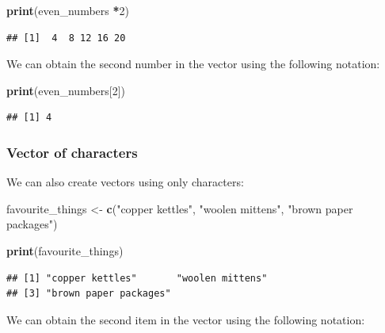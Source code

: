 \documentclass[
]{krantz}
\makeatletter
\newenvironment{Shaded}{\begin{snugshade}}{\end{snugshade}}
\newcommand{\DecValTok}[1]{\textcolor[rgb]{0.06,0.06,0.06}{#1}}
\newcommand{\KeywordTok}[1]{\textcolor[rgb]{0.27,0.27,0.27}{\textbf{#1}}}
\newcommand{\NormalTok}[1]{#1}
\newcommand{\OperatorTok}[1]{\textcolor[rgb]{0.43,0.43,0.43}{\textbf{#1}}}
\newcommand{\StringTok}[1]{\textcolor[rgb]{0.5,0.5,0.5}{#1}}
\newenvironment{kframe}{%
\medskip{}
\setlength{\fboxsep}{.8em}
 \def\at@end@of@kframe{}%
 \ifinner\ifhmode%
  \def\at@end@of@kframe{\end{minipage}}%
  \begin{minipage}{\columnwidth}%
 \fi\fi%
 \def\FrameCommand##1{\hskip\@totalleftmargin \hskip-\fboxsep
 \colorbox{shadecolor}{##1}\hskip-\fboxsep
     \hskip-\linewidth \hskip-\@totalleftmargin \hskip\columnwidth}%
 \MakeFramed {\advance\hsize-\width
   \@totalleftmargin\z@ \linewidth\hsize
   \@setminipage}}%
 {\par\unskip\endMakeFramed%
 \at@end@of@kframe}
\renewenvironment{Shaded}{\begin{kframe}}{\end{kframe}}
\makeatother
\begin{document}
\begin{Shaded}
\begin{Highlighting}[]
\KeywordTok{print}\NormalTok{(even_numbers }\OperatorTok{*}\DecValTok{2}\NormalTok{)}
\end{Highlighting}
\end{Shaded}

\begin{verbatim}
## [1]  4  8 12 16 20
\end{verbatim}

We can obtain the second number in the vector using the following notation:

\begin{Shaded}
\begin{Highlighting}[]
\KeywordTok{print}\NormalTok{(even_numbers[}\DecValTok{2}\NormalTok{])}
\end{Highlighting}
\end{Shaded}

\begin{verbatim}
## [1] 4
\end{verbatim}

\hypertarget{vector-of-characters}{%
\subsubsection{Vector of characters}\label{vector-of-characters}}

We can also create vectors using only characters:

\begin{Shaded}
\begin{Highlighting}[]
\NormalTok{favourite_things <-}\StringTok{ }\KeywordTok{c}\NormalTok{(}\StringTok{"copper kettles"}\NormalTok{, }\StringTok{"woolen mittens"}\NormalTok{, }\StringTok{"brown paper packages"}\NormalTok{)}
\end{Highlighting}
\end{Shaded}

\begin{Shaded}
\begin{Highlighting}[]
\KeywordTok{print}\NormalTok{(favourite_things)}
\end{Highlighting}
\end{Shaded}

\begin{verbatim}
## [1] "copper kettles"       "woolen mittens"      
## [3] "brown paper packages"
\end{verbatim}

We can obtain the second item in the vector using the following notation:
\end{document}
